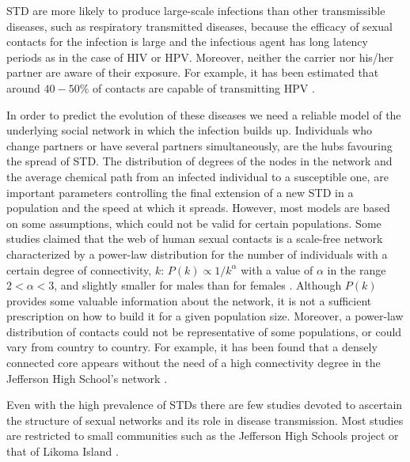STD are more likely to produce large-scale infections than other transmissible diseases, such as respiratory transmitted diseases, because the efficacy of sexual contacts for the infection is large and the infectious agent has long latency periods as in the case of HIV or HPV. Moreover, neither the carrier nor his/her partner are aware of their exposure. For example, it has been estimated that around $40-50\%$ of contacts are capable of transmitting HPV \cite{burchell2006modeling}.

In order to predict the evolution of these diseases we need a reliable model of the underlying social network in which the infection builds up. Individuals who change partners or have several partners simultaneously, are the hubs favouring the spread of STD. The distribution of degrees of the nodes in the network and the average chemical path from an infected individual to a susceptible one, are important parameters controlling the final extension of a new STD in a population and the speed at which it spreads. However, most models are based on some assumptions, which could not be valid for certain populations. Some studies claimed that the web of human sexual contacts is a scale-free network characterized by a power-law distribution for the number of individuals with a certain degree of connectivity, $k$: $P(k)\propto 1/k^\alpha$ with a value of $\alpha$ in the range $2 <\alpha < 3$, and slightly smaller for males than for females \cite{liljeros2001web}. Although $P(k)$ provides some valuable information about the network, it is not a sufficient prescription on how to build it for a given population size. Moreover, a power-law distribution of contacts could not be representative of some populations, or could vary from country to country. For example, it has been found that a densely connected core appears without the need of a high connectivity degree in the Jefferson High School's network \cite{bearman2004chains}. 

Even with the high prevalence of STDs there are few studies devoted to ascertain the structure of sexual networks and its role in disease transmission. Most studies are restricted to small communities such as the Jefferson High Schools project \cite{bearman2004chains} or that of Likoma Island \cite{helleringer2007sexual}.

